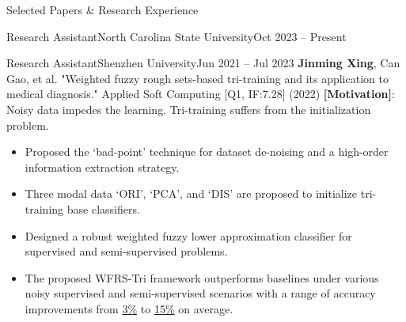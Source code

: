 \documentclass[]{mcdowellcv}
\begin{document}
\begin{cvsection}{Selected Papers \& Research Experience}
\begin{cvsubsection}{Research Assistant}{North Carolina State University}{Oct 2023 -- Present}
    \end{cvsubsection}
    \vspace*{-6pt}
    \begin{cvsubsection}{Research Assistant}{Shenzhen University}{Jun 2021 -- Jul 2023}
        \textbf{Jinming Xing}, Can Gao, et al. "Weighted fuzzy rough sets-based tri-training and its application to medical diagnosis." Applied Soft Computing [Q1, IF:7.28] (2022) \newline
        \textbf{[Motivation]}: Noisy data impedes the learning. Tri-training suffers from the initialization problem.
        \begin{itemize}
            \item Proposed the `bad-point' technique for dataset de-noising and a high-order information extraction strategy.
            \item Three modal data `ORI', `PCA', and `DIS' are proposed to initialize tri-training base classifiers.
            \item Designed a robust weighted fuzzy lower approximation classifier for supervised and semi-supervised
                  problems.
            \item The proposed WFRS-Tri framework outperforms baselines under various noisy supervised and semi-supervised scenarios with a range of accuracy improvements from \underline{3\%} to \underline{15\%} on average.
        \end{itemize}
    \end{cvsubsection}


\end{cvsection}
\end{document}
